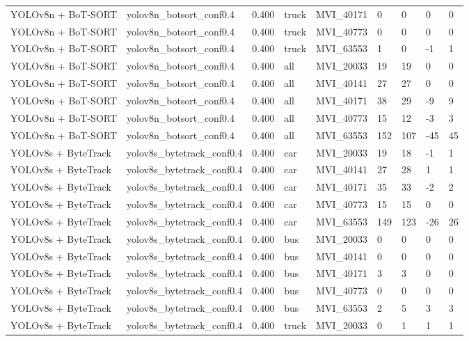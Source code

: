 \begin{tabular}{lllllllll}
YOLOv8n + BoT-SORT & yolov8n\_botsort\_conf0.4 & 0.400 & truck & MVI\_40171 & 0 & 0 & 0 & 0 \\
YOLOv8n + BoT-SORT & yolov8n\_botsort\_conf0.4 & 0.400 & truck & MVI\_40773 & 0 & 0 & 0 & 0 \\
YOLOv8n + BoT-SORT & yolov8n\_botsort\_conf0.4 & 0.400 & truck & MVI\_63553 & 1 & 0 & -1 & 1 \\
YOLOv8n + BoT-SORT & yolov8n\_botsort\_conf0.4 & 0.400 & all & MVI\_20033 & 19 & 19 & 0 & 0 \\
YOLOv8n + BoT-SORT & yolov8n\_botsort\_conf0.4 & 0.400 & all & MVI\_40141 & 27 & 27 & 0 & 0 \\
YOLOv8n + BoT-SORT & yolov8n\_botsort\_conf0.4 & 0.400 & all & MVI\_40171 & 38 & 29 & -9 & 9 \\
YOLOv8n + BoT-SORT & yolov8n\_botsort\_conf0.4 & 0.400 & all & MVI\_40773 & 15 & 12 & -3 & 3 \\
YOLOv8n + BoT-SORT & yolov8n\_botsort\_conf0.4 & 0.400 & all & MVI\_63553 & 152 & 107 & -45 & 45 \\
YOLOv8s + ByteTrack & yolov8s\_bytetrack\_conf0.4 & 0.400 & car & MVI\_20033 & 19 & 18 & -1 & 1 \\
YOLOv8s + ByteTrack & yolov8s\_bytetrack\_conf0.4 & 0.400 & car & MVI\_40141 & 27 & 28 & 1 & 1 \\
YOLOv8s + ByteTrack & yolov8s\_bytetrack\_conf0.4 & 0.400 & car & MVI\_40171 & 35 & 33 & -2 & 2 \\
YOLOv8s + ByteTrack & yolov8s\_bytetrack\_conf0.4 & 0.400 & car & MVI\_40773 & 15 & 15 & 0 & 0 \\
YOLOv8s + ByteTrack & yolov8s\_bytetrack\_conf0.4 & 0.400 & car & MVI\_63553 & 149 & 123 & -26 & 26 \\
YOLOv8s + ByteTrack & yolov8s\_bytetrack\_conf0.4 & 0.400 & bus & MVI\_20033 & 0 & 0 & 0 & 0 \\
YOLOv8s + ByteTrack & yolov8s\_bytetrack\_conf0.4 & 0.400 & bus & MVI\_40141 & 0 & 0 & 0 & 0 \\
YOLOv8s + ByteTrack & yolov8s\_bytetrack\_conf0.4 & 0.400 & bus & MVI\_40171 & 3 & 3 & 0 & 0 \\
YOLOv8s + ByteTrack & yolov8s\_bytetrack\_conf0.4 & 0.400 & bus & MVI\_40773 & 0 & 0 & 0 & 0 \\
YOLOv8s + ByteTrack & yolov8s\_bytetrack\_conf0.4 & 0.400 & bus & MVI\_63553 & 2 & 5 & 3 & 3 \\
YOLOv8s + ByteTrack & yolov8s\_bytetrack\_conf0.4 & 0.400 & truck & MVI\_20033 & 0 & 1 & 1 & 1 \\

\end{tabular}
